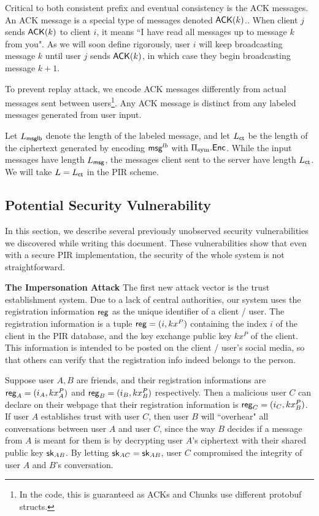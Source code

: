 Critical to both consistent prefix and eventual consistency is the ACK messages. An ACK message is a special type of messages denoted $\mathsf{ACK}(k)$.. When client $j$ sends $\mathsf{ACK}(k)$ to client $i$, it means ``I have read all messages up to message $k$ from you". As we will soon define rigorously, user $i$ will keep broadcasting message $k$ until user $j$ sends $\mathsf{ACK}(k)$, in which case they begin broadcasting message $k + 1$. 

To prevent replay attack, we encode ACK messages differently from actual messages sent between users\footnote{In the code, this is guaranteed as ACKs and Chunks use different protobuf structs.}. Any ACK message is distinct from any labeled messages generated from user input.

Let $L_{\mathsf{msglb}}$ denote the length of the labeled message, and let $L_{\mathsf{ct}}$ be the length of the ciphertext generated by encoding $\mathsf{msg}^{lb}$ with $\Pi_{\text{sym}}.\mathsf{Enc}$. While the input messages have length $L_{\mathsf{msg}}$, the messages client sent to the server have length $L_{\mathsf{ct}}$. We will take $L = L_{\mathsf{ct}}$ in the PIR scheme.
\subsection{Potential Security Vulnerability}
\label{sec:security-vulnerable}
In this section, we describe several previously unobserved security vulnerabilities we discovered while writing this document. These vulnerabilities show that even with a secure PIR implementation, the security of the whole system is not straightforward.

\textbf{The Impersonation Attack} The first new attack vector is the trust establishment system. Due to a lack of central authorities, our system uses the registration information $\mathsf{reg}$ as the unique identifier of a client / user. The registration information is a tuple $\mathsf{reg} = (i, kx^P)$ containing the index $i$ of the client in the PIR database, and the key exchange public key $kx^P$ of the client. This information is intended to be posted on the client / user's social media, so that others can verify that the registration info indeed belongs to the person.

Suppose user $A, B$ are friends, and their registration informations are $\mathsf{reg}_A = (i_A, kx^P_A)$ and $\mathsf{reg}_B = (i_B, kx^P_B)$ respectively. Then a malicious user $C$ can declare on their webpage that their registration information is $\mathsf{reg}_C = (i_C, kx^P_B)$. If user $A$ establishes trust with user $C$, then user $B$ will ``overhear" all conversations between user $A$ and user $C$, since the way $B$ decides if a message from $A$ is meant for them is by decrypting user $A$'s ciphertext with their shared public key ${\mathsf{sk}}_{AB}$. By letting ${\mathsf{sk}}_{AC} = {\mathsf{sk}}_{AB}$, user $C$ compromised the integrity of user $A$ and $B$'s conversation.

